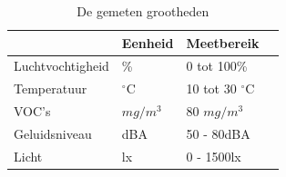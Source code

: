 \begin{table}[ht]
    \centering
    \begin{tabular}{l||l|l|l}
        & Eenheid & Meetbereik\\
        \hline
        Luchtvochtigheid & \%          & 0 tot 100\%           & \cite{palonen1993effects}  \\
        Temperatuur      & $^{\circ}$C & 10 tot 30 $^{\circ}$C & \cite{palonen1993effects}  \\
        VOC's            & \(mg/m^3\)  & 80 \(mg/m^3\)         & \cite{voc-luchtkwaliteit}  \\
        Geluidsniveau    & dBA         & 50 - 80dBA            & \cite{geluid-levels}       \\
        Licht            & lx          & 0 - 1500lx            & \cite{lightingIndorWorkspaces}
    \end{tabular}
    \caption{De gemeten grootheden}
    \label{tab:grootheden}
\end{table}

 